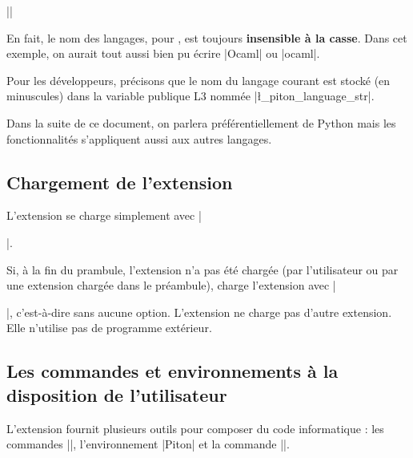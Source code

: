 \documentclass[dvipsnames,svgnames]{article}
\begin{document}
\smallskip
||

\smallskip
En fait, le nom des langages, pour , est toujours \textbf{insensible à la
  casse}. Dans cet exemple, on aurait tout aussi bien pu écrire |Ocaml| ou |ocaml|.

\smallskip
Pour les développeurs, précisons que le nom du langage courant est stocké (en minuscules)
dans la variable publique L3 nommée |\l_piton_language_str|.

\smallskip
Dans la suite de ce document, on parlera préférentiellement de Python mais les
fonctionnalités s'appliquent aussi aux autres langages.



\subsection{Chargement de l'extension}


L'extension  se charge simplement avec |\usepackage{piton}|.

\smallskip
Si, à la fin du prambule, l'extension  n'a pas été chargée (par l'utilisateur
ou par une extension chargée dans le préambule),  charge l'extension
 avec |\usepackage{xcolor}|, c'est-à-dire sans aucune option. L'extension
 ne charge pas d'autre extension. Elle n'utilise pas de programme extérieur.

\subsection{Les commandes et environnements à la disposition de l'utilisateur}


L'extension  fournit plusieurs outils pour composer du code informatique : les
commandes |\piton|, l'environnement |{Piton}| et la commande |\PitonInputFile|.
\end{document}
